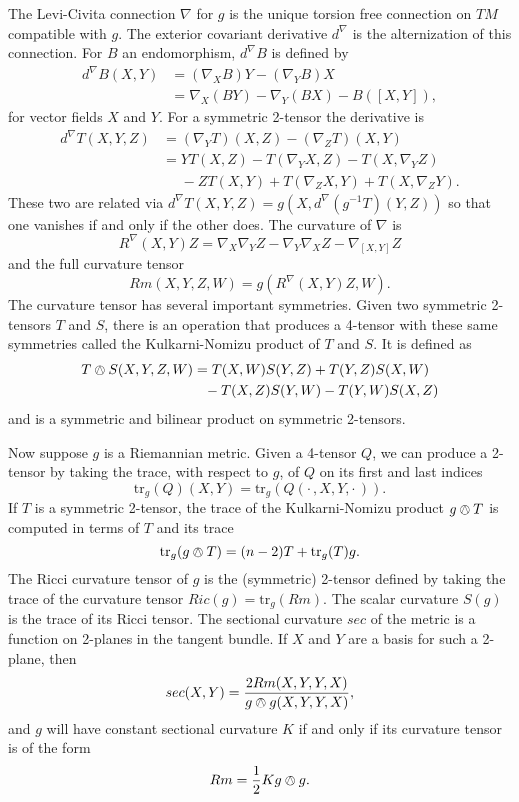 \documentclass{amsart}
\newcommand{\tr}{\mathrm{tr}}
\begin{document}
The Levi-Civita connection $\nabla$ for $g$ is the unique torsion free connection on $TM$ compatible with $g$.
The exterior covariant derivative $d^\nabla$ is the alternization of this connection.
For $B$ an endomorphism, $d^\nabla B$ is defined by
\begin{align*}
d^\nabla B(X,Y) &= (\nabla_XB)Y - (\nabla_YB)X \\
&= \nabla_X(BY)- \nabla_Y(BX) - B([X,Y]),
\end{align*}
for vector fields $X$ and $Y$.
For a symmetric 2-tensor the derivative is 
\begin{align*}
d^\nabla T(X,Y,Z)
&= (\nabla_YT)(X,Z)- (\nabla_Z T)(X,Y) \\
&= YT(X,Z) - T(\nabla_YX,Z) - T(X,\nabla_YZ) \\
&\phantom{=} - ZT(X,Y) + T(\nabla_ZX,Y) + T(X,\nabla_ZY).
\end{align*}
These two are related via $d^\nabla T(X,Y,Z) = g(X, d^\nabla(g^{-1}T)(Y,Z))$ so that one vanishes if and only if the other does.
The curvature of $\nabla$ is 
\[
R^\nabla(X,Y)Z = \nabla_X\nabla_Y Z - \nabla_Y\nabla_X Z - \nabla_{[X,Y]}Z
\]
and the full curvature tensor 
\[
Rm(X,Y,Z,W) = g(R^\nabla(X,Y)Z,W).
\]
The curvature tensor has several important symmetries.
Given two symmetric 2-tensors $T$ and $S$, there is an operation that produces a 4-tensor with these same symmetries called the Kulkarni-Nomizu product of $T$ and $S$. 
It is defined as
\begin{align*}
T \owedge S(X,Y,Z,W)
&= T(X,W)S(Y,Z) + T(Y,Z)S(X,W) \\
&\phantom{=} - T(X,Z)S(Y,W) - T(Y,W)S(X,Z)
\end{align*}
and is a symmetric and bilinear product on symmetric 2-tensors.


Now suppose $g$ is a Riemannian metric.
Given a 4-tensor $Q$, we can produce a 2-tensor by taking the trace, with respect to $g$, of $Q$ on its first and last indices
\[
\tr_g(Q)(X,Y) = \tr_g( Q(\cdot \, , X,Y, \cdot \,)).
\]
If $T$ is a symmetric 2-tensor, the trace of the Kulkarni-Nomizu product $g \owedge T$ is computed in terms of $T$ and its trace
\begin{equation}
\label{TraceKN}
\tr_g( g \owedge T) = (n-2)T + \tr_g(T)g.
\end{equation}
The Ricci curvature tensor of $g$ is the (symmetric) 2-tensor defined by taking the trace of the curvature tensor $Ric(g) = \tr_g(Rm)$.
The scalar curvature $S(g)$ is the trace of its Ricci tensor.
The sectional curvature $sec$ of the metric is a function on 2-planes in the tangent bundle. 
If $X$ and $Y$ are a basis for such a 2-plane, then
\[
sec(X,Y) = \frac{2Rm(X,Y,Y,X)}{g \owedge g(X,Y,Y,X)},
\]
and $g$ will have constant sectional curvature $K$ if and only if its curvature tensor is of the form 
\[
Rm = \frac{1}{2}K g \owedge g.
\]
\end{document}
